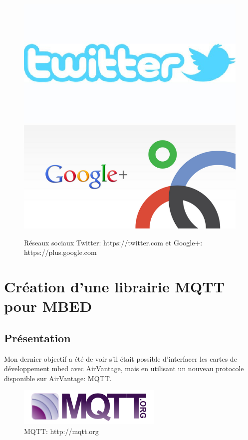\documentclass{article}
\begin{document}
\begin{figure}[h!]
    \centering
    \includegraphics[width=\linewidth/4]{img/twitter.jpg}
    \includegraphics[width=\linewidth/4]{img/plus.png}
    \caption{Réseaux sociaux Twitter: https://twitter.com et Google+: https://plus.google.com}
\end{figure}

\clearpage

\section{Création d’une librairie MQTT pour MBED}
\subsection{Présentation}

Mon dernier objectif a été de voir s’il était possible d’interfacer les cartes de développement mbed avec AirVantage, mais en utilisant un nouveau protocole disponible sur AirVantage: MQTT.

\begin{figure}[h!]
    \centering\includegraphics[width=\linewidth/3]{img/mqtt.png}
    \caption{MQTT: http://mqtt.org}
\end{figure}
\end{document}
